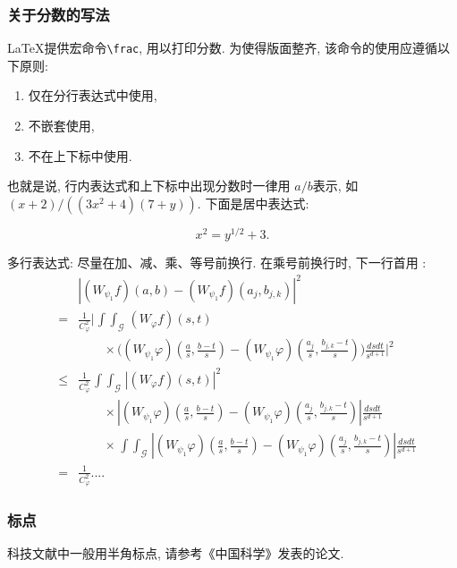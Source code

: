 \documentclass{nkuthesis}
\begin{document}
\subsubsection{关于分数的写法}

\LaTeX 提供宏命令\verb+\frac+, 用以打印分数. 为使得版面整齐, 该命令的使用应遵循以下原则:

\begin{enumerate}
\item 仅在分行表达式中使用,
\item 不嵌套使用,
\item 不在上下标中使用.
\end{enumerate}

也就是说, 行内表达式和上下标中出现分数时一律用 $a/b$表示, 如
$(x+2)/((3x^2+4)(7+y))$. 下面是居中表达式:

\[
 x^2 = y^{1/2} +3.
\]

多行表达式: 尽量在加、减、乘、等号前换行. 在乘号前换行时,
下一行首用 \string\times:
\def\iint{\mathop{\int\!\!\!\int}}\def\calG{\mathcal G}
\begin{eqnarray}
&&\left|(W_{\psi_1}f)(a,b)-(W_{\psi_1}f)(a_j,b_{j,k})\right|^{2}\nonumber\\
&=&\frac{1}{C^{2}_{\varphi}}\Bigg|\iint_{\calG} (W_{\varphi}f)(s,t) \nonumber\\
&&\qquad\times \Bigg( (W_{\psi_1}\varphi)\left(\frac{a}{s},
\frac{b-t}{s}\right)
     -(W_{\psi_1}\varphi)\left(\frac{a_{j}}{s}, \frac{b_{j,k}-t}{s}\right)\Bigg)
  \frac{dsdt}{s^{d+1}}\Bigg|^2 \nonumber\\
&\le& \frac{1}{C^2_{\varphi}} \iint_{\calG} |(W_{\varphi}f)(s,t)|^2 \nonumber\\
&&\qquad \times\left| (W_{\psi_1}\varphi)\left(\frac{a}{s},
\frac{b-t}{s}\right)
    -(W_{\psi_1}\varphi)\left(\frac{a_{j}}{s}, \frac{b_{j,k}-t}{s}\right)\right|
   \frac{dsdt}{s^{d+1}}  \nonumber\\
&&\qquad \times   \iint_{\calG}\!
 \left|(W_{\psi_1}\varphi)\left(\frac{a}{s}, \frac{b-t}{s}\right)
    -(W_{\psi_1}\varphi)\left(\frac{a_{j}}{s}, \frac{b_{j,k}-t}{s}\right)\right|
 \frac{ ds dt}{s^{d+1}} \nonumber\\
&=& \frac{1}{C^2_{\varphi}} ....  \label{eq:a0}
\end{eqnarray}


\subsubsection{标点}
科技文献中一般用半角标点, 请参考《中国科学》发表的论文.
\end{document}
